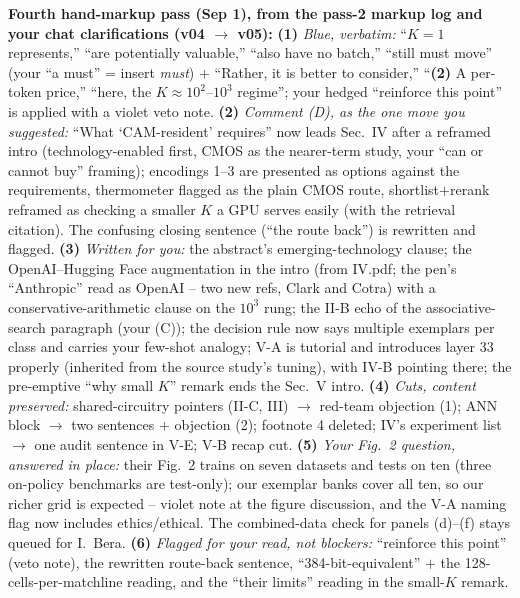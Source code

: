 \documentclass[conference]{IEEEtran}
\begin{document}
{\begin{pnote}[aiviolet]
\textbf{Fourth hand-markup pass (Sep 1), from the pass-2 markup log
and your chat clarifications (v04 $\to$ v05):}
{\bf (1)} \emph{Blue, verbatim:} ``$K=1$ represents,'' ``are
potentially valuable,'' ``also have no batch,'' ``still must move''
(your ``a must'' = insert \emph{must}) $+$ ``Rather, it is better to
consider,'' ``{\bf (2)} A per-token price,'' ``here, the
$K\approx10^{2}$--$10^{3}$ regime''; your hedged ``reinforce this
point'' is applied with a violet veto note.
{\bf (2)} \emph{Comment (D), as the one move you suggested:} ``What
`CAM-resident' requires'' now leads Sec.~IV after a reframed intro
(technology-enabled first, CMOS as the nearer-term study, your
``can or cannot buy'' framing); encodings 1--3 are presented as
options against the requirements, thermometer flagged as the plain
CMOS route, shortlist$+$rerank reframed as checking a smaller $K$ a
GPU serves easily (with the retrieval citation). The confusing
closing sentence (``the route back'') is rewritten and flagged.
{\bf (3)} \emph{Written for you:} the abstract's emerging-technology
clause; the OpenAI--Hugging Face augmentation in the intro (from
IV.pdf; the pen's ``Anthropic'' read as OpenAI -- two new refs,
Clark and Cotra) with a conservative-arithmetic clause on the
$10^{3}$ rung; the II-B echo of the associative-search paragraph
(your (C)); the decision rule now says multiple exemplars per class
and carries your few-shot analogy; V-A is tutorial and introduces
layer 33 properly (inherited from the source study's tuning), with
IV-B pointing there; the pre-emptive ``why small $K$'' remark ends
the Sec.~V intro.
{\bf (4)} \emph{Cuts, content preserved:} shared-circuitry pointers
(II-C, III) $\to$ red-team objection (1); ANN block $\to$ two
sentences $+$ objection (2); footnote 4 deleted; IV's
experiment list $\to$ one audit sentence in V-E; V-B recap cut.
{\bf (5)} \emph{Your Fig.~2 question, answered in place:} their
Fig.~2 trains on seven datasets and tests on ten (three on-policy
benchmarks are test-only); our exemplar banks cover all ten, so our
richer grid is expected -- violet note at the figure discussion, and
the V-A naming flag now includes ethics/ethical. The combined-data
check for panels (d)--(f) stays queued for I.~Bera.
{\bf (6)} \emph{Flagged for your read, not blockers:} ``reinforce
this point'' (veto note), the rewritten route-back sentence,
``384-bit-equivalent'' $+$ the 128-cells-per-matchline reading, and
the ``their limits'' reading in the small-$K$ remark.


\end{pnote}}
\end{document}

